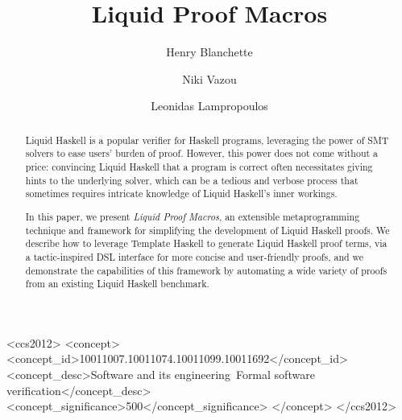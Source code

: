 \documentclass[sigplan,screen]{acmart}
\begin{document}
\title{Liquid Proof Macros}

\author{Henry Blanchette}

\author{Niki Vazou}

\author{Leonidas Lampropoulos}

\renewcommand{\shortauthors}{Blanchette et al.}

\begin{abstract}
Liquid Haskell is a popular verifier for Haskell programs,
leveraging the power of SMT solvers to ease users' burden of proof.
%
However, this power does not come without a price:
convincing Liquid Haskell that a program is correct
often necessitates giving hints to the underlying solver, which can be
a tedious and verbose process that sometimes requires intricate
knowledge of Liquid Haskell's inner workings.

In this paper, we present {\em Liquid Proof Macros}, an extensible
metaprogramming technique and framework for simplifying the
development of Liquid Haskell proofs.
%
We describe how to leverage Template Haskell to generate Liquid
Haskell proof terms, via a tactic-inspired DSL interface for more
concise and user-friendly proofs,
%
and we demonstrate the capabilities of this framework by automating
a wide variety of proofs from an existing Liquid Haskell benchmark.
\end{abstract}

\begin{CCSXML}
<ccs2012>
   <concept>
       <concept_id>10011007.10011074.10011099.10011692</concept_id>
       <concept_desc>Software and its engineering~Formal software verification</concept_desc>
       <concept_significance>500</concept_significance>
       </concept>
 </ccs2012>
\end{CCSXML}
\end{document}
